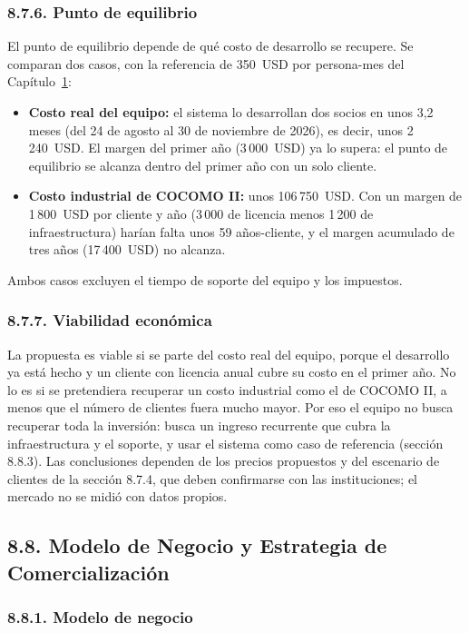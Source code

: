 \subsubsection{8.7.6. Punto de equilibrio}

El punto de equilibrio depende de qué costo de desarrollo se recupere. Se comparan dos casos, con la referencia de 350~USD por persona-mes del Capítulo~\hyperref[cap:paps]{1}:

\begin{itemize}
    \item \textbf{Costo real del equipo:} el sistema lo desarrollan dos socios en unos 3,2 meses (del 24 de agosto al 30 de noviembre de 2026), es decir, unos 2\,240~USD. El margen del primer año (3\,000~USD) ya lo supera: el punto de equilibrio se alcanza dentro del primer año con un solo cliente.
    \item \textbf{Costo industrial de COCOMO II:} unos 106\,750~USD. Con un margen de 1\,800~USD por cliente y año (3\,000 de licencia menos 1\,200 de infraestructura) harían falta unos 59 años-cliente, y el margen acumulado de tres años (17\,400~USD) no alcanza.
\end{itemize}

Ambos casos excluyen el tiempo de soporte del equipo y los impuestos.

\subsubsection{8.7.7. Viabilidad económica}

La propuesta es viable si se parte del costo real del equipo, porque el desarrollo ya está hecho y un cliente con licencia anual cubre su costo en el primer año. No lo es si se pretendiera recuperar un costo industrial como el de COCOMO II, a menos que el número de clientes fuera mucho mayor. Por eso el equipo no busca recuperar toda la inversión: busca un ingreso recurrente que cubra la infraestructura y el soporte, y usar el sistema como caso de referencia (sección 8.8.3). Las conclusiones dependen de los precios propuestos y del escenario de clientes de la sección 8.7.4, que deben confirmarse con las instituciones; el mercado no se midió con datos propios.

\subsection{8.8. Modelo de Negocio y Estrategia de Comercialización}

\subsubsection{8.8.1. Modelo de negocio}

